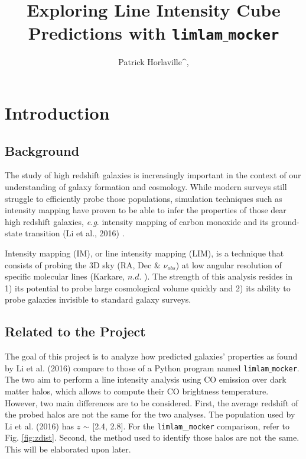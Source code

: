 \documentclass[apj]{emulateapj}
\begin{document}
\title{Exploring Line Intensity Cube Predictions with \MakeLowercase{\texttt{limlam$\_$mocker}}}
 
\author{Patrick Horlaville^{,}}



\section{Introduction}
\label{sec:intro}
\subsection{Background}
The study of high redshift galaxies is increasingly important in the context of our understanding of galaxy formation and cosmology. While modern surveys still struggle to efficiently probe those populations, simulation techniques such as intensity mapping have proven to be able to infer the properties of those dear high redshift galaxies, \textit{e.g}. intensity mapping of carbon monoxide and its ground-state transition (Li et al., 2016) \cite{Li_2016}.

Intensity mapping (IM), or line intensity mapping (LIM), is a technique that consists of probing the 3D sky (RA, Dec \& $\nu_{obs}$) at low angular resolution of specific molecular lines (Karkare, $n.d.$ \cite{Karkare}). The strength of this analysis resides in 1) its potential to probe large cosmological volume quickly and 2) its ability to probe galaxies invisible to standard galaxy surveys. 

\subsection{Related to the Project}

The goal of this project is to analyze how predicted galaxies' properties as found by Li et al. (2016) \cite{Li_2016} compare to those of a Python program named \texttt{limlam$\_$mocker}. The two aim to perform a line intensity analysis using CO emission over dark matter halos, which allows to compute their CO brightness temperature. However, two main differences are to be considered. First, the average redshift of the probed halos are not the same for the two analyses. The population used by Li et al. (2016) \cite{Li_2016} has $z$ $\sim$ [2.4, 2.8]. For the \texttt{limlam}\_\texttt{mocker} comparison, refer to Fig. \ref{fig:zdist}. Second, the method used to identify those halos are not the same. This will be elaborated upon later.
\end{document}
